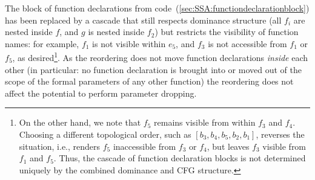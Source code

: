 The block of function declarations from
code~(\ref{sec:SSA:functiondeclarationblock}) has been replaced by a
cascade that still respects dominance structure (all $f_i$ are nested
inside $f$, and $g$ is nested inside $f_2$) but restricts the
visibility of function names: for example, $f_1$ is not visible within
$e_5$, and $f_3$ is not accessible from $f_1$ or $f_5$, as
desired\footnote{On the other hand, we note that $f_5$ remains visible
from within $f_3$ and $f_4$. Choosing a different topological order,
such as $[b_3,b_4,b_5,b_2,b_1]$, reverses the situation, i.e., renders
$f_5$ inaccessible from $f_3$ or $f_4$, but leaves $f_3$ visible from
$f_1$ and $f_5$. Thus, the cascade of function declaration blocks is
not determined uniquely by the combined dominance and CFG structure.}.
As the reordering does not move function declarations \emph{inside}
each other (in particular: no function declaration is brought into or
moved out of the scope of the formal parameters of any other function)
the reordering does not affect the potential to perform parameter
dropping.
\\


